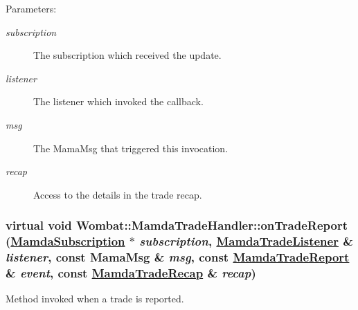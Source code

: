 \begin{Desc}
\item[Parameters:]
\begin{description}
\item[{\em subscription}]The subscription which received the update. \item[{\em listener}]The listener which invoked the callback. \item[{\em msg}]The Mama\-Msg that triggered this invocation. \item[{\em recap}]Access to the details in the trade recap. \end{description}
\end{Desc}
\hypertarget{classWombat_1_1MamdaTradeHandler_627de635c463dad8736b3c4fbf6f40ed}{
\subsubsection[onTradeReport]{\setlength{\rightskip}{0pt plus 5cm}virtual void Wombat::Mamda\-Trade\-Handler::on\-Trade\-Report (\hyperlink{classWombat_1_1MamdaSubscription}{Mamda\-Subscription} $\ast$ {\em subscription}, \hyperlink{classWombat_1_1MamdaTradeListener}{Mamda\-Trade\-Listener} \& {\em listener}, const Mama\-Msg \& {\em msg}, const \hyperlink{classWombat_1_1MamdaTradeReport}{Mamda\-Trade\-Report} \& {\em event}, const \hyperlink{classWombat_1_1MamdaTradeRecap}{Mamda\-Trade\-Recap} \& {\em recap})}}
\label{classWombat_1_1MamdaTradeHandler_627de635c463dad8736b3c4fbf6f40ed}


Method invoked when a trade is reported. 

